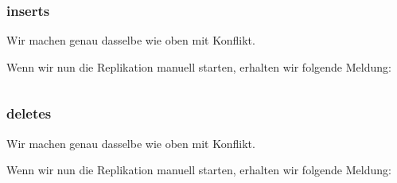 \documentclass[11pt,a4paper,parskip=half]{scrartcl}
\begin{document}
\subsubsection{inserts}
Wir machen genau dasselbe wie oben mit Konflikt.

Wenn wir nun die Replikation manuell starten, erhalten wir folgende Meldung:
\begin{lstlisting}
\end{lstlisting}
\subsubsection{deletes}
Wir machen genau dasselbe wie oben mit Konflikt.

Wenn wir nun die Replikation manuell starten, erhalten wir folgende Meldung:
\begin{lstlisting}
\end{lstlisting}
\end{document}

